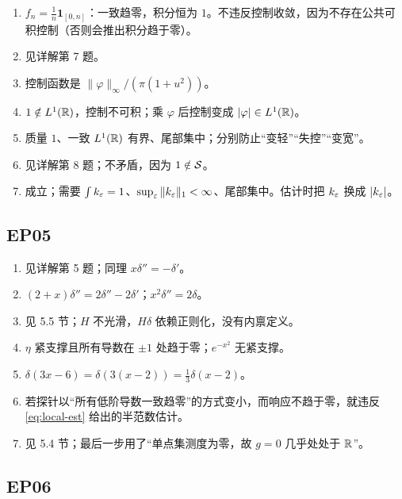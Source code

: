 \begin{enumerate}[leftmargin=1.8em,itemsep=0.3em]
\item $f_n=\frac1n\mathbf{1}_{[0,n]}$：一致趋零，积分恒为 $1$。不违反控制收敛，因为不存在公共可积控制（否则会推出积分趋于零）。
\item 见详解第 7 题。
\item 控制函数是 $\|\varphi\|_\infty/(\pi(1+u^{2}))$。
\item $1\notin L^1(\mathbb{R})$，控制不可积；乘 $\varphi$ 后控制变成 $|\varphi|\in L^1(\mathbb{R})$。
\item 质量 $1$、一致 $L^1(\mathbb{R})$ 有界、尾部集中；分别防止“变轻”“失控”“变宽”。
\item 见详解第 8 题；不矛盾，因为 $1\notin\mathcal{S}$。
\item 成立；需要 $\int k_\varepsilon=1$、$\sup_\varepsilon\|k_\varepsilon\|_1<\infty$、尾部集中。估计时把 $k_\varepsilon$ 换成 $|k_\varepsilon|$。
\end{enumerate}

\subsection*{EP05}

\begin{enumerate}[leftmargin=1.8em,itemsep=0.3em]
\item 见详解第 5 题；同理 $x\delta''=-\delta'$。
\item $(2+x)\delta''=2\delta''-2\delta'$；$x^{2}\delta''=2\delta$。
\item 见 5.5 节；$H$ 不光滑，$H\delta$ 依赖正则化，没有内禀定义。
\item $\eta$ 紧支撑且所有导数在 $\pm1$ 处趋于零；$e^{-x^{2}}$ 无紧支撑。
\item $\delta(3x-6)=\delta(3(x-2))=\frac13\delta(x-2)$。
\item 若探针以“所有低阶导数一致趋零”的方式变小，而响应不趋于零，就违反 \eqref{eq:local-est} 给出的半范数估计。
\item 见 5.4 节；最后一步用了“单点集测度为零，故 $g=0$ 几乎处处于 $\mathbb{R}$”。
\end{enumerate}

\subsection*{EP06}

